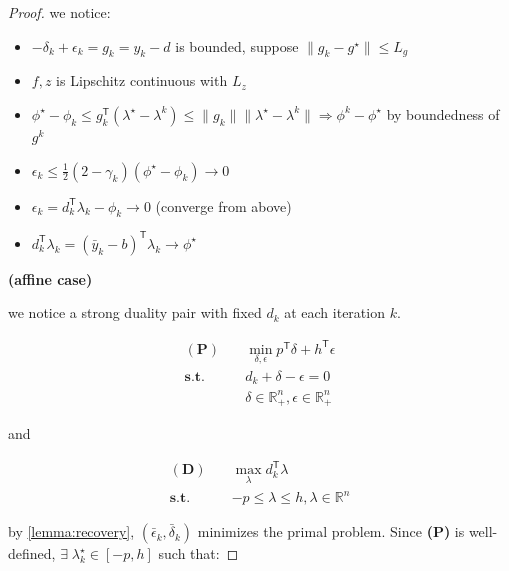 \begin{proof} we notice:
  \begin{itemize}
    \tightlist
    \item
          \(- \delta_k + \epsilon_k = g_k = y_k -d\) is bounded, suppose
          \(\|g_k - g^\star\|\le L_g\)
    \item
          \(f, z\) is Lipschitz continuous with \(L_z\)
    \item
          \(\phi^\star - \phi_k \le g_k^\mathsf{T} (\lambda^\star - \lambda^k)\le \|g_k\|\|\lambda^\star - \lambda^k\|\Rightarrow \phi^k -\phi^\star\)
          by boundedness of \(g^k\)
    \item
          \(\epsilon_k \le \frac{1}{2}(2 - \gamma_k) ( \phi^\star - \phi_k) \to 0\)
    \item
          \(\epsilon_k = d_k^\mathsf{T} \lambda_k - \phi_k \to 0\) (converge
          from above)
    \item
          \(d_k^\mathsf{T} \lambda_k = (\bar y_k - b)^\mathsf{T} \lambda_k \to \phi^\star\)
  \end{itemize}

  \textbf{(affine case)}

  we notice a strong duality pair with fixed \(d_k\) at each iteration
  \(k\).

  \begin{equation}
    \begin{aligned}
      \mathbf{(P)}  \quad & \min_{\delta, \epsilon} p^\mathsf{T} \delta + h^\mathsf{T} \epsilon \\
      \mathbf{s.t.} \quad & d_k + \delta - \epsilon = 0                                         \\
                          & \delta \in \mathbb{R}_+^n, \epsilon \in \mathbb{R}_+^n
    \end{aligned}
  \end{equation}

  and

  \begin{equation}
    \begin{aligned}
      \mathbf{(D)}  \quad & \max_{\lambda} d_k^\mathsf{T} \lambda          \\
      \mathbf{s.t.} \quad & -p \le \lambda \le h, \lambda \in \mathbb{R}^n
    \end{aligned}
  \end{equation}

  by \ref{lemma:recovery}, \((\bar \epsilon_k, \bar \delta_k)\) minimizes the primal
  problem. Since \textbf{(P)} is well-defined,
  \(\exists\; \lambda_k^\star \in [-p, h]\) such that:


\end{proof}
